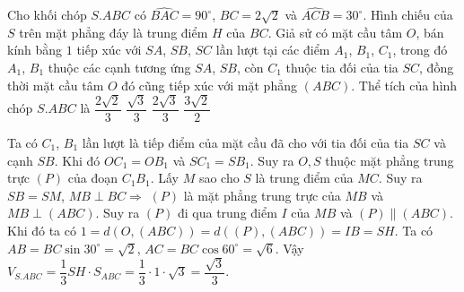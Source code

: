 \begin{ex}%
Cho khối chóp $S.ABC$ có $\widehat{BAC}=90^\circ$, $BC=2\sqrt{2}$ và $\widehat{ACB}=30^\circ$. Hình chiếu của $S$ trên mặt phẳng đáy là trung điểm $H$ của $BC$. Giả sử có mặt cầu tâm $O$, bán kính bằng $1$ tiếp xúc với $SA$, $SB$, $SC$ lần lượt tại các điểm $A_1$, $B_1$, $C_1$, trong đó $A_1$, $B_1$ thuộc các cạnh tương ứng $SA$, $SB$, còn $C_1$ thuộc tia đối của tia $SC$, đồng thời mặt cầu tâm $O$ đó cũng tiếp xúc với mặt phẳng $(ABC)$. Thể tích của hình chóp $S.ABC$ là
\choice
{$\dfrac{2\sqrt{2}}{3}$}
{\True $\dfrac{\sqrt{3}}{3}$}
{ $\dfrac{2\sqrt{3}}{3}$}
{$\dfrac{3\sqrt{2}}{2}$}
\loigiai
{\immini
{
 Ta có $C_1$, $B_1$ lần lượt là tiếp điểm của mặt cầu đã cho với tia đối của tia $SC$ và cạnh $SB$. Khi đó $OC_1=OB_1$ và $SC_1=SB_1$. Suy ra $O, S$ thuộc mặt phẳng trung trực $(P)$ của đoạn $C_1B_1$. Lấy $M$ sao cho $S$ là trung điểm của $MC$. Suy ra $SB=SM$, $MB\perp BC\Rightarrow$ $(P)$ là mặt phẳng trung trực của $MB$ và $MB\perp (ABC)$. Suy ra $(P)$ đi qua trung điểm $I$ của $MB$ và $(P)\parallel (ABC)$. Khi đó ta có $1=d(O, (ABC))=d((P), (ABC))=IB=SH$. Ta có $AB=BC\sin30^\circ=\sqrt{2}$, $AC=BC\cos60^\circ=\sqrt{6}$. Vậy $V_{S.ABC}=\dfrac{1}{3}SH\cdot S_{ABC}=\dfrac{1}{3}\cdot 1\cdot\sqrt{3}=\dfrac{\sqrt{3}}{3}$.
}
{
}
}
\end{ex}
